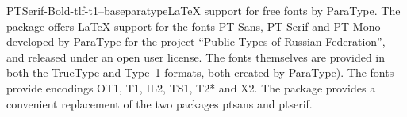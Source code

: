 \documentclass{ddltxtyp}
\begin{document}
\begin{package}{PTSerif-Bold-tlf-t1--base}{paratype}{{\LaTeX} support for free fonts by ParaType.}
The package offers {\LaTeX} support for the fonts PT Sans, PT
Serif and PT Mono developed by ParaType for the project ``Public
Types of Russian Federation'', and released under an open user
license. The fonts themselves are provided in both the TrueType
and Type~1 formats, both created by ParaType). The fonts
provide encodings OT1, T1, IL2, TS1, T2* and X2. The package
provides a convenient replacement of the two packages ptsans
and ptserif.
\end{package}
\end{document}

